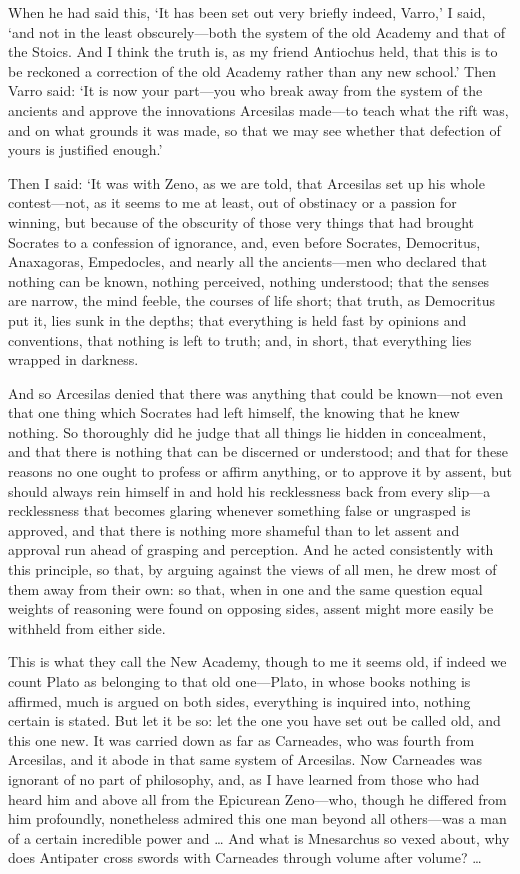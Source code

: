  When he had said this, `It has been set out very briefly indeed, Varro,' I said, `and not in the least obscurely—both the system of the old Academy and that of the Stoics. And I think the truth is, as my friend Antiochus held, that this is to be reckoned a correction of the old Academy rather than any new school.' Then Varro said: `It is now your part—you who break away from the system of the ancients and approve the innovations Arcesilas made—to teach what the rift was, and on what grounds it was made, so that we may see whether that defection of yours is justified enough.'

 Then I said: `It was with Zeno, as we are told, that Arcesilas set up his whole contest—not, as it seems to me at least, out of obstinacy or a passion for winning, but because of the obscurity of those very things that had brought Socrates to a confession of ignorance, and, even before Socrates, Democritus, Anaxagoras, Empedocles, and nearly all the ancients—men who declared that nothing can be known, nothing perceived, nothing understood; that the senses are narrow, the mind feeble, the courses of life short; that truth, as Democritus put it, lies sunk in the depths; that everything is held fast by opinions and conventions, that nothing is left to truth; and, in short, that everything lies wrapped in darkness.

 And so Arcesilas denied that there was anything that could be known—not even that one thing which Socrates had left himself, the knowing that he knew nothing. So thoroughly did he judge that all things lie hidden in concealment, and that there is nothing that can be discerned or understood; and that for these reasons no one ought to profess or affirm anything, or to approve it by assent, but should always rein himself in and hold his recklessness back from every slip—a recklessness that becomes glaring whenever something false or ungrasped is approved, and that there is nothing more shameful than to let assent and approval run ahead of grasping and perception. And he acted consistently with this principle, so that, by arguing against the views of all men, he drew most of them away from their own: so that, when in one and the same question equal weights of reasoning were found on opposing sides, assent might more easily be withheld from either side.

 This is what they call the New Academy, though to me it seems old, if indeed we count Plato as belonging to that old one—Plato, in whose books nothing is affirmed, much is argued on both sides, everything is inquired into, nothing certain is stated. But let it be so: let the one you have set out be called old, and this one new. It was carried down as far as Carneades, who was fourth from Arcesilas, and it abode in that same system of Arcesilas. Now Carneades was ignorant of no part of philosophy, and, as I have learned from those who had heard him and above all from the Epicurean Zeno—who, though he differed from him profoundly, nonetheless admired this one man beyond all others—was a man of a certain incredible power and … And what is Mnesarchus so vexed about, why does Antipater cross swords with Carneades through volume after volume? …
